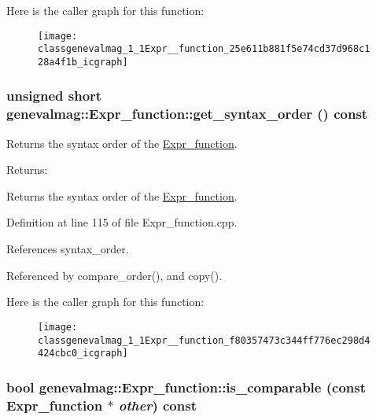 Here is the caller graph for this function:\nopagebreak
\begin{figure}[H]
\begin{center}
\leavevmode
\texttt{[image: classgenevalmag\_1\_1Expr\_\_function\_25e611b881f5e74cd37d968c128a4f1b\_icgraph]}
\end{center}
\end{figure}
\hypertarget{classgenevalmag_1_1Expr__function_f80357473c344ff776ec298d4424cbc0}{
\subsubsection[{get\_\-syntax\_\-order}]{\setlength{\rightskip}{0pt plus 5cm}unsigned short genevalmag::Expr\_\-function::get\_\-syntax\_\-order () const}}
\label{classgenevalmag_1_1Expr__function_f80357473c344ff776ec298d4424cbc0}


Returns the syntax order of the \hyperlink{classgenevalmag_1_1Expr__function}{Expr\_\-function}. \begin{Desc}
\item[Returns:]\end{Desc}
Returns the syntax order of the \hyperlink{classgenevalmag_1_1Expr__function}{Expr\_\-function}. 

Definition at line 115 of file Expr\_\-function.cpp.

References syntax\_\-order.

Referenced by compare\_\-order(), and copy().

Here is the caller graph for this function:\nopagebreak
\begin{figure}[H]
\begin{center}
\leavevmode
\texttt{[image: classgenevalmag\_1\_1Expr\_\_function\_f80357473c344ff776ec298d4424cbc0\_icgraph]}
\end{center}
\end{figure}
\hypertarget{classgenevalmag_1_1Expr__function_24aaf520c742fde5eff5c8c596549009}{
\subsubsection[{is\_\-comparable}]{\setlength{\rightskip}{0pt plus 5cm}bool genevalmag::Expr\_\-function::is\_\-comparable (const {\bf Expr\_\-function} $\ast$ {\em other}) const}}
\label{classgenevalmag_1_1Expr__function_24aaf520c742fde5eff5c8c596549009}


